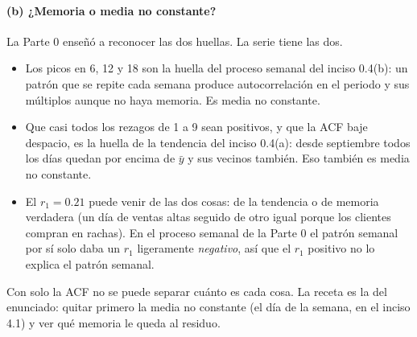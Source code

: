 \paragraph{(b) ¿Memoria o media no constante?} La Parte 0 enseñó a reconocer
las dos huellas. La serie tiene las dos.
\begin{itemize}
  \item Los picos en 6, 12 y 18 son la huella del proceso semanal del inciso
    0.4(b): un patrón que se repite cada semana produce autocorrelación en el
    periodo y sus múltiplos aunque no haya memoria. Es media no constante.
  \item Que casi todos los rezagos de 1 a 9 sean positivos, y que la ACF baje
    despacio, es la huella de la tendencia del inciso 0.4(a): desde septiembre
    todos los días quedan por encima de $\bar y$ y sus vecinos también. Eso
    también es media no constante.
  \item El $r_1=0.21$ puede venir de las dos cosas: de la tendencia o de
    memoria verdadera (un día de ventas altas seguido de otro igual porque los
    clientes compran en rachas). En el proceso semanal de la Parte 0 el patrón
    semanal por sí solo daba un $r_1$ ligeramente \emph{negativo}, así que el
    $r_1$ positivo no lo explica el patrón semanal.
\end{itemize}
Con solo la ACF no se puede separar cuánto es cada cosa. La receta es la del
enunciado: quitar primero la media no constante (el día de la semana, en el
inciso 4.1) y ver qué memoria le queda al residuo.
